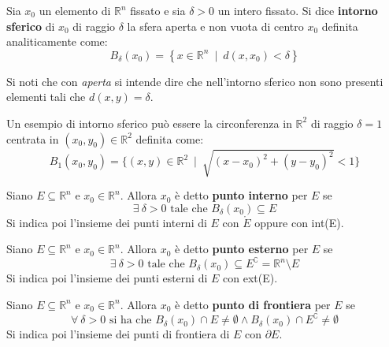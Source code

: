 \begin{definition}
    Sia $x_0$ un elemento di $\mathbb{R}^n$ fissato e sia $\delta>0$ un intero fissato. Si dice \textbf{intorno sferico} di $x_0$ di raggio $\delta$ la sfera aperta e non vuota di centro $x_0$ definita analiticamente come:
    \begin{equation}
        B_\delta(x_0)=\left\{x \in \mathbb{R}^n \ \mid \ d(x, x_0) < \delta \right\}
    \end{equation}
    \begin{oss}
        Si noti che con \textit{aperta} si intende dire che nell'intorno sferico non sono presenti elementi tali che $d(x, y)=\delta$.
    \end{oss}
    \begin{example}
        Un esempio di intorno sferico può essere la circonferenza in $\mathbb{R}^2$ di raggio $\delta=1$ centrata in $(x_0, y_0) \in \mathbb{R}^2$ definita come:
        \begin{equation*}
            B_1(x_0, y_0)= \{(x,y) \in \mathbb{R}^2 \ \mid \ \sqrt{(x-x_0)^2+(y-y_0)^2}< 1\}
        \end{equation*}
    \end{example}
\end{definition}
\begin{definition}
    Siano $E \subseteq \mathbb{R}^n$ e $x_0 \in \mathbb{R}^n$. Allora $x_0$ è detto \textbf{punto interno} per $E$ se 
    \begin{equation}
        \exists\ \delta>0 \text{ tale che } B_\delta(x_0) \subseteq E 
    \end{equation}
    Si indica poi l'insieme dei punti interni di $E$ con $\mathring{E}$ oppure con int(E).
\end{definition}
\begin{definition}
    Siano $E \subseteq \mathbb{R}^n$ e $x_0 \in \mathbb{R}^n$. Allora $x_0$ è detto \textbf{punto esterno} per $E$ se 
    \begin{equation}
        \exists \ \delta>0 \text{ tale che } B_\delta(x_0) \subseteq E^\complement = \mathbb{R}^n \setminus E
    \end{equation}
    Si indica poi l'insieme dei punti esterni di $E$ con ext(E).
\end{definition}
\begin{definition}
    Siano $E \subseteq \mathbb{R}^n$ e $x_0 \in \mathbb{R}^n$. Allora $x_0$ è detto \textbf{punto di frontiera} per $E$ se 
    \begin{equation}
        \forall \ \delta>0 \text{ si ha che } B_\delta(x_0) \cap E \neq \emptyset \land B_\delta(x_0) \cap E^\complement \neq \emptyset 
    \end{equation}
    Si indica poi l'insieme dei punti di frontiera di $E$ con $\partial{E}$.
\end{definition}

